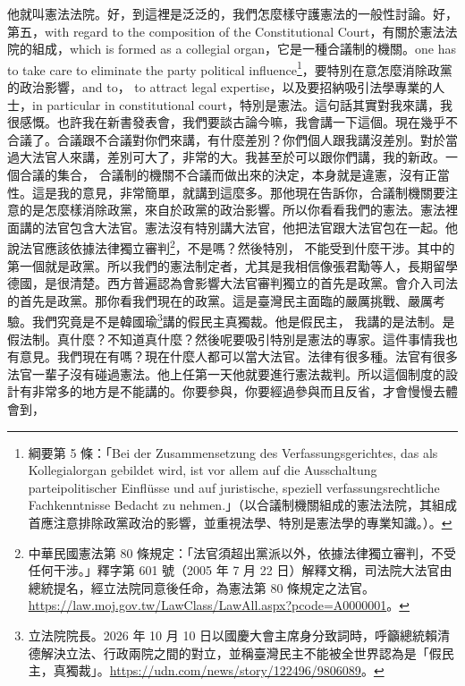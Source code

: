 \hypertarget{w05:cue:155}{}他就叫憲法法院。好，到這裡是泛泛的，我們怎麼樣守護憲法的一般性討論。好，第五，with regard to the composition of the Constitutional Court，有關於憲法法院的組成，which is formed as a collegial organ，它是一種合議制的機關。one has to take care to eliminate the party political influence\footnote{綱要第 5 條：「Bei der Zusammensetzung des Verfassungsgerichtes, das als Kollegialorgan gebildet wird, ist vor allem auf die Ausschaltung parteipolitischer Einflüsse und auf juristische, speziell verfassungsrechtliche Fachkenntnisse Bedacht zu nehmen.」（以合議制機關組成的憲法法院，其組成首應注意排除政黨政治的影響，並重視法學、特別是憲法學的專業知識。）\cite[85]{kelsen1929}。}，要特別在意怎麼消除政黨的政治影響，and to，
\hypertarget{w05:cue:156}{}to attract legal expertise，以及要招納吸引法學專業的人士，in particular in constitutional court，特別是憲法。這句話其實對我來講，我很感慨。也許我在新書發表會，我們要談古論今嘛，我會講一下這個。現在幾乎不合議了。合議跟不合議對你們來講，有什麼差別？你們個人跟我講沒差別。對於當過大法官人來講，差別可大了，非常的大。我甚至於可以跟你們講，我的新政。一個合議的集合，
\hypertarget{w05:cue:157}{}合議制的機關不合議而做出來的決定，本身就是違憲，沒有正當性。這是我的意見，非常簡單，就講到這麼多。那他現在告訴你，合議制機關要注意的是怎麼樣消除政黨，來自於政黨的政治影響。所以你看看我們的憲法。憲法裡面講的法官包含大法官。憲法沒有特別講大法官，他把法官跟大法官包在一起。他說法官應該依據法律獨立審判\footnote{中華民國憲法第 80 條規定：「法官須超出黨派以外，依據法律獨立審判，不受任何干涉。」釋字第 601 號（2005 年 7 月 22 日）解釋文稱，司法院大法官由總統提名，經立法院同意後任命，為憲法第 80 條規定之法官。\url{https://law.moj.gov.tw/LawClass/LawAll.aspx?pcode=A0000001}。}，不是嗎？然後特別，
\hypertarget{w05:cue:158}{}不能受到什麼干涉。其中的第一個就是政黨。所以我們的憲法制定者，尤其是我相信像張君勱等人，長期留學德國，是很清楚。西方普遍認為會影響大法官審判獨立的首先是政黨。會介入司法的首先是政黨。那你看我們現在的政黨。這是臺灣民主面臨的嚴厲挑戰、嚴厲考驗。我們究竟是不是韓國瑜\footnote{立法院院長。2026 年 10 月 10 日以國慶大會主席身分致詞時，呼籲總統賴清德解決立法、行政兩院之間的對立，並稱臺灣民主不能被全世界認為是「假民主，真獨裁」。\url{https://udn.com/news/story/122496/9806089}。}講的假民主真獨裁。他是假民主，
\hypertarget{w05:cue:159}{}我講的是法制。是假法制。真什麼？不知道真什麼？然後呢要吸引特別是憲法的專家。這件事情我也有意見。我們現在有嗎？現在什麼人都可以當大法官。法律有很多種。法官有很多法官一輩子沒有碰過憲法。他上任第一天他就要進行憲法裁判。所以這個制度的設計有非常多的地方是不能講的。你要參與，你要經過參與而且反省，才會慢慢去體會到，
